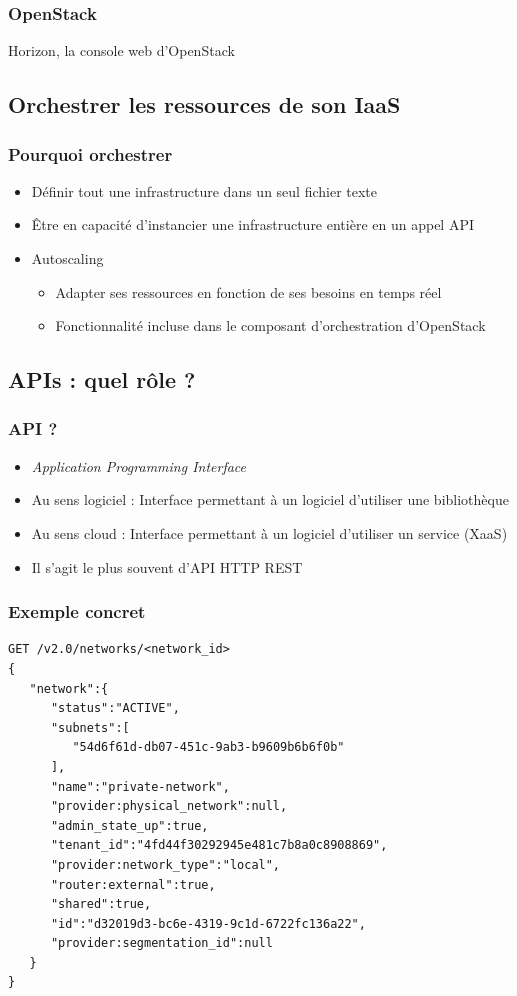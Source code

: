   \begin{frame}
    \frametitle{OpenStack}
    \huge{Horizon, la console web d'OpenStack}
  \end{frame}

  \subsection[Orchestration]{Orchestrer les ressources de son IaaS}

  \begin{frame}
    \frametitle{Pourquoi orchestrer}
    \begin{itemize}
      \item Définir tout une infrastructure dans un seul fichier texte
      \item Être en capacité d'instancier une infrastructure entière en un appel API
      \item Autoscaling
      \begin{itemize}
        \item Adapter ses ressources en fonction de ses besoins en temps réel
        \item Fonctionnalité incluse dans le composant d'orchestration d'OpenStack
      \end{itemize}
    \end{itemize}
  \end{frame}

  \subsection[APIs]{APIs : quel rôle ?}

  \begin{frame}
    \frametitle{API ?}
    \begin{itemize}
      \item \textit{Application Programming Interface}
      \item Au sens logiciel : Interface permettant à un logiciel d'utiliser une bibliothèque
      \item Au sens cloud : Interface permettant à un logiciel d'utiliser un service (XaaS)
      \item Il s'agit le plus souvent d'API HTTP REST
    \end{itemize}
  \end{frame}

  \begin{frame}[containsverbatim]
    \frametitle{Exemple concret}
\begin{verbatim}
GET /v2.0/networks/<network_id>
{
   "network":{
      "status":"ACTIVE",
      "subnets":[
         "54d6f61d-db07-451c-9ab3-b9609b6b6f0b"
      ],
      "name":"private-network",
      "provider:physical_network":null,
      "admin_state_up":true,
      "tenant_id":"4fd44f30292945e481c7b8a0c8908869",
      "provider:network_type":"local",
      "router:external":true,
      "shared":true,
      "id":"d32019d3-bc6e-4319-9c1d-6722fc136a22",
      "provider:segmentation_id":null
   }
}
\end{verbatim}
  \end{frame}

